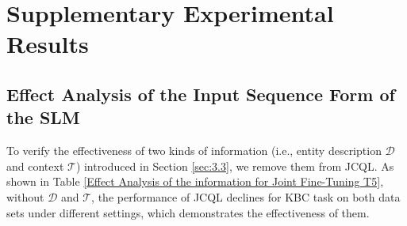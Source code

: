 \section{Supplementary Experimental Results} \label{appendix:supplementary_results}

\subsection{Effect Analysis of the Input Sequence Form of the SLM}
To verify the effectiveness of two kinds of information (i.e., entity description \textbf{$\mathcal{D}$} and context \textbf{$\mathcal{T}$}) introduced in Section \ref{sec:3.3}, we remove them from JCQL. As shown in Table \ref{Effect Analysis of the information for Joint Fine-Tuning T5}, without \textbf{$\mathcal{D}$} and \textbf{$\mathcal{T}$}, the performance of JCQL declines for KBC task on both data sets under different settings, which demonstrates the effectiveness of them. 


